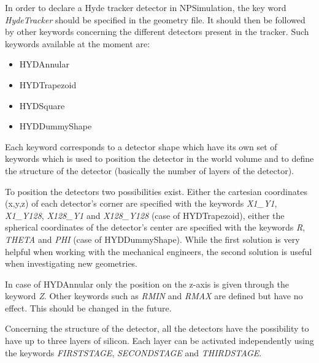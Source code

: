 \documentclass[a4paper,12pt]{article}
\begin{document}
In order to declare a Hyde tracker detector in NPSimulation, the key
word {\it HydeTracker} should be specified in the geometry file. It
should then be followed by other keywords concerning the different
detectors present in the tracker. Such keywords available at the moment
are:

\begin{itemize}
   \item {HYDAnnular}
   \item {HYDTrapezoid}
   \item {HYDSquare}
   \item {HYDDummyShape}
\end{itemize}

Each keyword corresponds to a detector shape which have its own set of
keywords which is used to position the detector in the world volume
and to define the structure of the detector (basically the number of 
layers of the detector).

To position the detectors two possibilities exist. Either the cartesian 
coordinates (x,y,z) of each detector's corner are specified with the 
keywords {\it X1\_Y1}, {\it X1\_Y128}, {\it X128\_Y1} and {\it X128\_Y128}
(case of HYDTrapezoid), either the spherical coordinates of the detector's 
center are specified with the keywords {\it R}, {\it THETA} and {\it PHI} 
(case of HYDDummyShape). While the first solution is very helpful when 
working with the mechanical engineers, the second solution is useful when 
investigating new geometries.

In case of HYDAnnular only the position on the z-axis is given through
the keyword {\it Z}. Other keywords such as {\it RMIN} and {\it RMAX} 
are defined but have no effect. This should be changed in the future.

Concerning the structure of the detector, all the detectors have the 
possibility to have up to three layers of silicon. Each layer can be 
activated independently using the keywords {\it FIRSTSTAGE}, 
{\it SECONDSTAGE} and {\it THIRDSTAGE}. 
\end{document}
